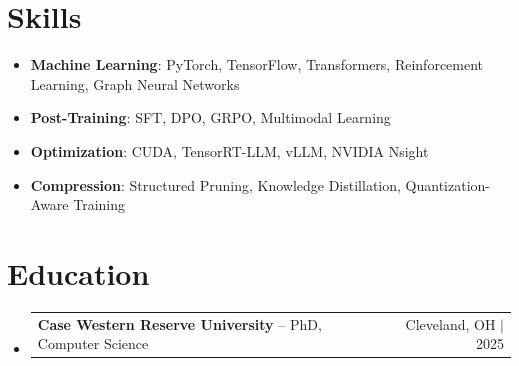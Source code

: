 \documentclass[letterpaper,13pt]{article}
\makeatletter
\newcommand{\resumeProjectHeading}[2]{
    \item
    \begin{tabular*}{\textwidth}{l@{\extracolsep{\fill}}r}
      \small#1 & #2 \\
    \end{tabular*}\vspace{-4pt}
}
\newcommand{\resumeSubHeadingListStart}{\begin{itemize}[leftmargin=0in, label={}]}
\newcommand{\resumeSubHeadingListEnd}{\end{itemize}}
\makeatother
\begin{document}
\section{Skills}
\vspace{0.02cm}
\begin{itemize}[leftmargin=0.15in, label={}, itemsep=2pt, topsep=1pt]
  \item \textbf{Machine Learning}: PyTorch, TensorFlow, Transformers, Reinforcement Learning, Graph Neural Networks
  \item \textbf{Post-Training}: SFT, DPO, GRPO, Multimodal Learning
  \item \textbf{Optimization}: CUDA, TensorRT-LLM, vLLM, NVIDIA Nsight
  \item \textbf{Compression}: Structured Pruning, Knowledge Distillation, Quantization-Aware Training
\end{itemize}
\vspace{0.02cm}

\section{Education}
\resumeSubHeadingListStart
  \resumeProjectHeading{\textbf{Case Western Reserve University} -- PhD, Computer Science}{Cleveland, OH $|$ 2025}
\resumeSubHeadingListEnd
\end{document}
